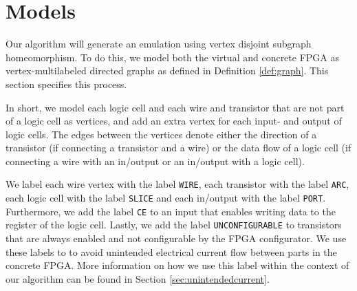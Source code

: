 \chapter{Models}
\label{chapter:models}
Our algorithm will generate an emulation using vertex disjoint subgraph homeomorphism. To do this, we model both the virtual and concrete FPGA as vertex-multilabeled directed graphs as defined in Definition \ref{def:graph}. This section specifies this process.

In short, we model each logic cell and each wire and transistor that are not part of a logic cell as vertices, and add an extra vertex for each input- and output of logic cells. The edges between the vertices denote either the direction of a transistor (if connecting a transistor and a wire) or the data flow of a logic cell (if connecting a wire with an in/output or an in/output with a logic cell).

We label each wire vertex with the label \texttt{WIRE}, each transistor with the label \texttt{ARC}, each logic cell with the label \texttt{SLICE} and each in/output with the label \texttt{PORT}. Furthermore, we add the label \texttt{CE} to an input that enables writing data to the register of the logic cell. Lastly, we add the label \texttt{UNCONFIGURABLE} to transistors that are always enabled and not configurable by the FPGA configurator. We use these labels to to avoid unintended electrical current flow between parts in the concrete FPGA. More information on how we use this label within the context of our algorithm can be found in Section \ref{sec:unintendedcurrent}.